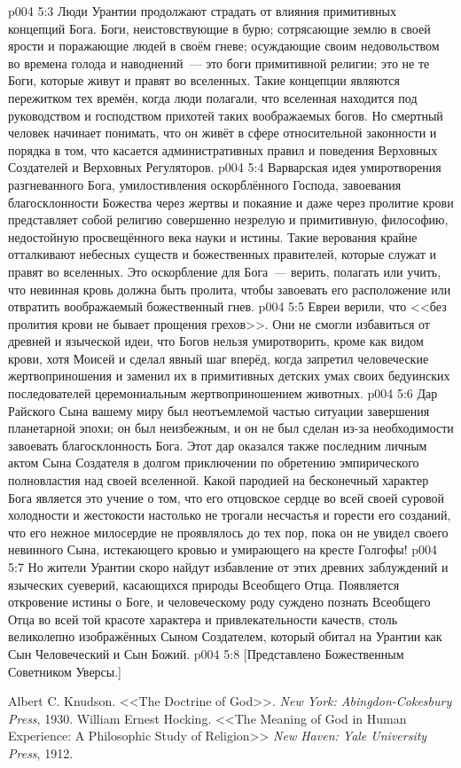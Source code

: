 \vs p004 5:3 \pc Люди Урантии продолжают страдать от влияния примитивных концепций Бога. Боги, неистовствующие в бурю; сотрясающие землю в своей ярости и поражающие людей в своём гневе; осуждающие своим недовольством во времена голода и наводнений~--- это боги примитивной религии; это не те Боги, которые живут и правят во вселенных. Такие концепции являются пережитком тех времён, когда люди полагали, что вселенная находится под руководством и господством прихотей таких воображаемых богов. Но смертный человек начинает понимать, что он живёт в сфере относительной законности и порядка в том, что касается административных правил и поведения Верховных Создателей и Верховных Регуляторов.
\vs p004 5:4 \pc Варварская идея умиротворения разгневанного Бога, умилостивления оскорблённого Господа, завоевания благосклонности Божества через жертвы и покаяние и даже через пролитие крови представляет собой религию совершенно незрелую и примитивную, философию, недостойную просвещённого века науки и истины. Такие верования крайне отталкивают небесных существ и божественных правителей, которые служат и правят во вселенных. Это оскорбление для Бога~--- верить, полагать или учить, что невинная кровь должна быть пролита, чтобы завоевать его расположение или отвратить воображаемый божественный гнев.
\vs p004 5:5 Евреи верили, что <<без пролития крови не бывает прощения грехов>>. Они не смогли избавиться от древней и языческой идеи, что Богов нельзя умиротворить, кроме как видом крови, хотя Моисей и сделал явный шаг вперёд, когда запретил человеческие жертвоприношения и заменил их в примитивных детских умах своих бедуинских последователей церемониальным жертвоприношением животных.
\vs p004 5:6 Дар Райского Сына вашему миру был неотъемлемой частью ситуации завершения планетарной эпохи; он был неизбежным, и он не был сделан из\hyp{}за необходимости завоевать благосклонность Бога. Этот дар оказался также последним личным актом Сына Создателя в долгом приключении по обретению эмпирического полновластия над своей вселенной. Какой пародией на бесконечный характер Бога является это учение о том, что его отцовское сердце во всей своей суровой холодности и жестокости настолько не трогали несчастья и горести его созданий, что его нежное милосердие не проявлялось до тех пор, пока он не увидел своего невинного Сына, истекающего кровью и умирающего на кресте Голгофы!
\vs p004 5:7 Но жители Урантии скоро найдут избавление от этих древних заблуждений и языческих суеверий, касающихся природы Всеобщего Отца. Появляется откровение истины о Боге, и человеческому роду суждено познать Всеобщего Отца во всей той красоте характера и привлекательности качеств, столь великолепно изображённых Сыном Создателем, который обитал на Урантии как Сын Человеческий и Сын Божий.
\vsetoff
\vs p004 5:8 [Представлено Божественным Советником Уверсы.]
\quizlink
\begin{thebibliography}{100}
Albert C. Knudson.
{<<The Doctrine of God>>.}
{\em New York: Abingdon-Cokesbury Press}, 1930.
William Ernest Hocking.
{<<The Meaning of God in Human Experience: A Philosophic Study of Religion>>}
{\em New Haven: Yale University Press}, 1912.
\end{thebibliography}
